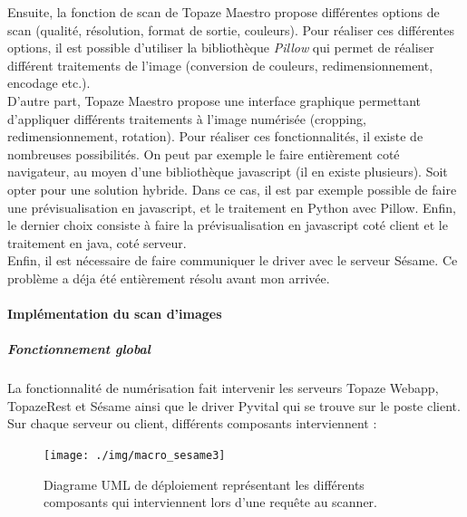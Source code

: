 Ensuite, la fonction de scan de Topaze Maestro propose différentes options de scan (qualité, résolution, format de sortie, couleurs). Pour réaliser ces différentes options, il est possible d'utiliser la bibliothèque \textit{Pillow} qui permet de réaliser différent traitements de l'image (conversion de couleurs, redimensionnement, encodage etc.)\cite{bib:pillow}.\\

D'autre part, Topaze Maestro propose une interface graphique permettant d'appliquer différents traitements à l'image numérisée (cropping, redimensionnement, rotation). 
Pour réaliser ces fonctionnalités, il existe de nombreuses possibilités. On peut par exemple le faire entièrement coté navigateur, au moyen d'une bibliothèque javascript (il en existe plusieurs). Soit opter pour une solution hybride. Dans ce cas, il est par exemple possible de faire une prévisualisation en javascript, et le traitement en Python avec Pillow. 
Enfin, le dernier choix consiste à faire la prévisualisation en javascript coté client et le traitement en java, coté serveur. \\

Enfin, il est nécessaire de faire communiquer le driver avec le serveur Sésame. Ce problème a déja été entièrement résolu avant mon arrivée.

\paragraph*{Implémentation du scan d'images}
\subparagraph*{Fonctionnement global}
La fonctionnalité de numérisation fait intervenir les serveurs Topaze Webapp, TopazeRest et Sésame ainsi que le driver Pyvital qui se trouve sur le poste client.
Sur chaque serveur ou client, différents composants interviennent :
\begin{figure}[H]
  \centering
  \texttt{[image: ./img/macro\_sesame3]}
  \caption{\label{fig:mb_va_ast} Diagrame UML de déploiement représentant les différents composants qui interviennent lors d'une requête au scanner.}
\end{figure}

